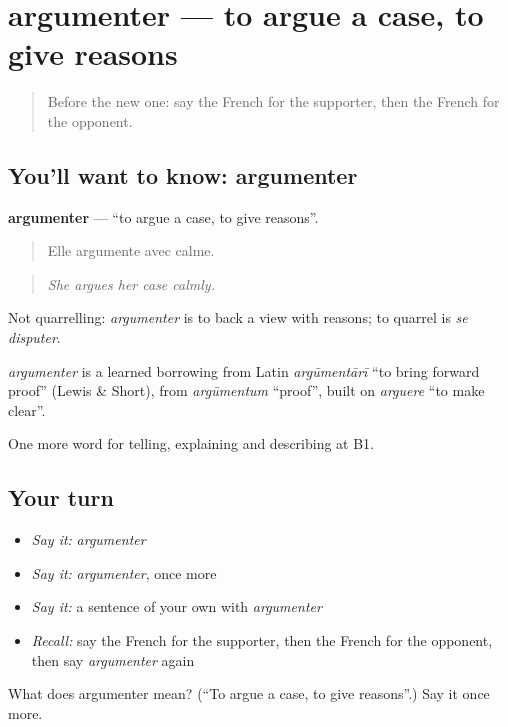 \section[argumenter]{argumenter — to argue a case, to give reasons}

\label{lesson:FR-C345-argumenter}



\begin{quote}
Before the new one: say the French for the supporter, then the French for the opponent.
\end{quote}

\subsection*{You'll want to know: argumenter}
\textbf{argumenter} — \textquotedblleft{}to argue a case, to give reasons\textquotedblright{}.

\begin{quote}
Elle argumente avec calme.
\end{quote}

\begin{quote}
\emph{She argues her case calmly.}
\end{quote}

Not quarrelling: \emph{argumenter} is to back a view with reasons; to quarrel is \emph{se disputer}.

\begin{cousinweb}
\emph{argumenter} is a learned borrowing from Latin \emph{argūmentārī} \textquotedblleft{}to bring forward proof\textquotedblright{} (Lewis \& Short), from \emph{argūmentum} \textquotedblleft{}proof\textquotedblright{}, built on \emph{arguere} \textquotedblleft{}to make clear\textquotedblright{}.
\end{cousinweb}

\begin{grammarlens}[title={What you've built}]
One more word for telling, explaining and describing at B1.
\end{grammarlens}

\subsection*{Your turn}
\begin{itemize}
\raggedright
  \item \emph{Say it:} \emph{argumenter}
  \item \emph{Say it:} \emph{argumenter}, once more
  \item \emph{Say it:} a sentence of your own with \emph{argumenter}
  \item \emph{Recall:} say the French for the supporter, then the French for the opponent, then say \emph{argumenter} again
\end{itemize}

\begin{tcolorbox}[breakable,colback=teal!4,colframe=teal!35!black,title={Before you move on}]
What does argumenter mean? (\textquotedblleft{}To argue a case, to give reasons\textquotedblright{}.) Say it once more.
\end{tcolorbox}
